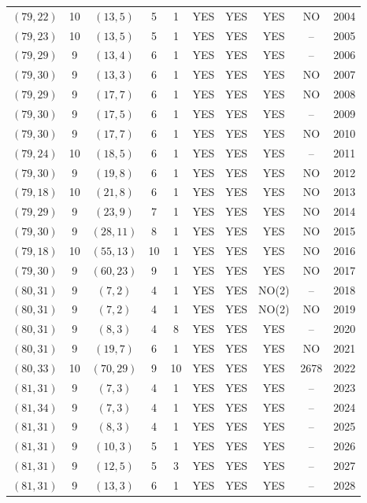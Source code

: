 \begin{longtable}{|c|c|c|c|c|c|c|c|c|c|}
$(79, 22)$ & 10 & $(13, 5)$ & 5 & 1 & YES & YES & YES & NO & 2004\\
$(79, 23)$ & 10 & $(13, 5)$ & 5 & 1 & YES & YES & YES & -- & 2005\\
$(79, 29)$ & 9 & $(13, 4)$ & 6 & 1 & YES & YES & YES & -- & 2006\\
$(79, 30)$ & 9 & $(13, 3)$ & 6 & 1 & YES & YES & YES & NO & 2007\\
$(79, 29)$ & 9 & $(17, 7)$ & 6 & 1 & YES & YES & YES & NO & 2008\\
$(79, 30)$ & 9 & $(17, 5)$ & 6 & 1 & YES & YES & YES & -- & 2009\\
$(79, 30)$ & 9 & $(17, 7)$ & 6 & 1 & YES & YES & YES & NO & 2010\\
$(79, 24)$ & 10 & $(18, 5)$ & 6 & 1 & YES & YES & YES & -- & 2011\\
$(79, 30)$ & 9 & $(19, 8)$ & 6 & 1 & YES & YES & YES & NO & 2012\\
$(79, 18)$ & 10 & $(21, 8)$ & 6 & 1 & YES & YES & YES & NO & 2013\\
$(79, 29)$ & 9 & $(23, 9)$ & 7 & 1 & YES & YES & YES & NO & 2014\\
$(79, 30)$ & 9 & $(28, 11)$ & 8 & 1 & YES & YES & YES & NO & 2015\\
$(79, 18)$ & 10 & $(55, 13)$ & 10 & 1 & YES & YES & YES & NO & 2016\\
$(79, 30)$ & 9 & $(60, 23)$ & 9 & 1 & YES & YES & YES & NO & 2017\\
$(80, 31)$ & 9 & $(7, 2)$ & 4 & 1 & YES & YES & NO(2) & -- & 2018\\
$(80, 31)$ & 9 & $(7, 2)$ & 4 & 1 & YES & YES & NO(2) & NO & 2019\\
$(80, 31)$ & 9 & $(8, 3)$ & 4 & 8 & YES & YES & YES & -- & 2020\\
$(80, 31)$ & 9 & $(19, 7)$ & 6 & 1 & YES & YES & YES & NO & 2021\\
$(80, 33)$ & 10 & $(70, 29)$ & 9 & 10 & YES & YES & YES & 2678 & 2022\\
$(81, 31)$ & 9 & $(7, 3)$ & 4 & 1 & YES & YES & YES & -- & 2023\\
$(81, 34)$ & 9 & $(7, 3)$ & 4 & 1 & YES & YES & YES & -- & 2024\\
$(81, 31)$ & 9 & $(8, 3)$ & 4 & 1 & YES & YES & YES & -- & 2025\\
$(81, 31)$ & 9 & $(10, 3)$ & 5 & 1 & YES & YES & YES & -- & 2026\\
$(81, 31)$ & 9 & $(12, 5)$ & 5 & 3 & YES & YES & YES & -- & 2027\\
$(81, 31)$ & 9 & $(13, 3)$ & 6 & 1 & YES & YES & YES & -- & 2028\\

\end{longtable}
